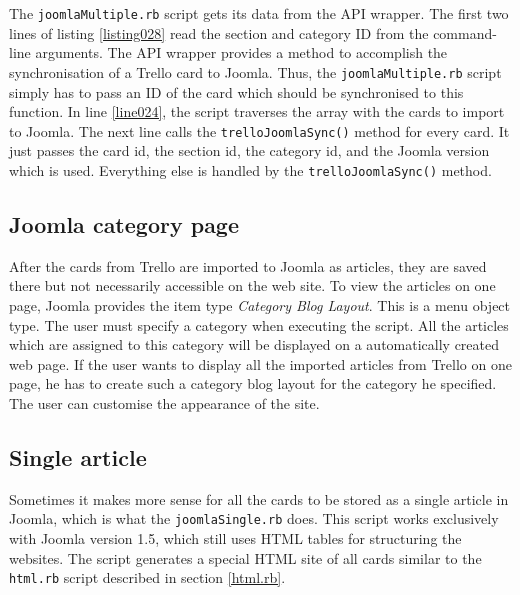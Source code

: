The \texttt{joomlaMultiple.rb} script gets its data from the API wrapper. The first two lines of listing \ref{listing028} read the section and category ID from the command-line arguments. The API wrapper provides a method to accomplish the synchronisation of a Trello card to Joomla. Thus, the \texttt{joomlaMultiple.rb} script simply has to pass an ID of the card which should be synchronised to this function. In line \ref{line024}, the script traverses the array with the cards to import to Joomla. The next line calls the \lstinline{trelloJoomlaSync()} method for every card. It just passes the card id, the section id, the category id, and the Joomla version which is used. Everything else is handled by the \lstinline{trelloJoomlaSync()} method.


\subsection{Joomla category page}

After the cards from Trello are imported to Joomla as articles, they are saved there but not necessarily accessible on the web site. To view the articles on one page, Joomla provides the item type \emph{Category Blog Layout}. This is a menu object type. The user must specify a category when executing the script. All the articles which are assigned to this category will be displayed on a automatically created web page. If the user wants to display all the imported articles from Trello on one page, he has to create such a category blog layout for the category he specified. The user can customise the appearance of the site.

\subsection{Single article}
Sometimes it makes more sense for all the cards to be stored as a single article in Joomla, which is what the \texttt{joomlaSingle.rb} does. This script works exclusively with Joomla version 1.5, which still uses HTML tables for structuring the websites. The script generates a special HTML site of all cards similar to the \texttt{html.rb} script described in section \ref{html.rb}.


